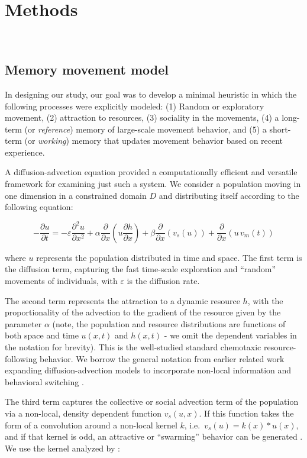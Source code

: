 \documentclass[utf8]{frontiersSCNS} %
\begin{document}
\section{Methods}
~
\subsection{Memory movement model}

	In designing our study, our goal was to develop a minimal heuristic in which the following processes were explicitly modeled: (1) Random or exploratory movement, (2) attraction to resources, (3) sociality in the movements, (4) a long-term (or \emph{reference}) memory of large-scale movement behavior, and (5) a short-term (or \emph{working}) memory that updates movement behavior based on recent experience.  
	
	A diffusion-advection equation provided a computationally efficient and versatile framework for examining just such a system. We consider a population moving in one dimension in a constrained domain $D$ and distributing itself according to the following equation:
	
	\begin{equation}\label{eq_mainmodel}
		-{\frac{\partial u}{\partial t}} = -\varepsilon {\frac{\partial^2 u}{\partial x^2}} + 
		\alpha \frac{\partial}{\partial x}\left(u \frac{\partial h}{\partial x}\right) + 
		\beta \frac{\partial}{\partial x}\left(v_s(u)\right) + \frac{\partial}{\partial x}\left(u\,v_m(t)\right)
		\end{equation}
	
	\noindent where $u$ represents the population distributed in time and space. The first term is the diffusion term, capturing the fast time-scale exploration and ``random'' movements of individuals, with $\varepsilon$ is the diffusion rate.
	
	The second term represents the attraction to a dynamic resource $h$, with the proportionality of the advection to the gradient of the resource given by the parameter $\alpha$ (note, the population and resource distributions are functions of both space and time $u(x,t)$ and $h(x,t)$ - we omit the dependent variables in the notation for brevity). This is the well-studied standard chemotaxic resource-following behavior. We borrow the general notation from earlier related work expanding diffusion-advection models to incorporate non-local information \citep{Fagan2017} and behavioral switching \citep{Fagan2019}.
	
	The third term captures the collective or social advection term of the population via a non-local, density dependent function $v_s(u,x)$. If this function takes the form of a convolution around a non-local kernel $k$, i.e.~$v_s(u) = k(x) * u(x)$, and if that kernel is odd, an attractive or ``swarming'' behavior can be generated \citep{Mogilner1999}. We use the kernel analyzed by \citet{Mogilner1999}: 
	
\end{document}

